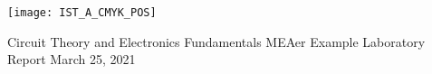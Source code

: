 \thispagestyle {empty}
\texttt{[image: IST\_A\_CMYK\_POS]}
\begin{center}
\vspace{1.0cm}
{\FontLb Circuit Theory and Electronics Fundamentals} 
\vspace{1cm}
{MEAer}
\vspace{1cm}
{\FontSn Example Laboratory Report}
\vspace{1cm}
{\FontSn March 25, 2021}
\end{center}
